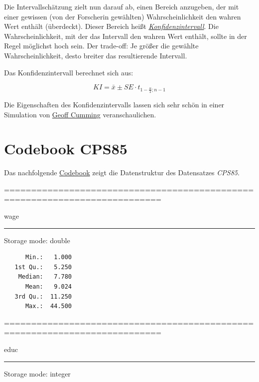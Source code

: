\documentclass[]{article}
\begin{document}
Die Intervallschätzung zielt nun darauf ab, einen Bereich anzugeben, der
mit einer gewissen (von der Forscherin gewählten) Wahrscheinlichkeit den
wahren Wert enthält (überdeckt). Dieser Bereich heißt
\href{https://de.wikipedia.org/wiki/Konfidenzintervall}{\emph{Konfidenzintervall}}.
Die Wahrscheinlichkeit, mit der das Intervall den wahren Wert enthält,
sollte in der Regel möglichst hoch sein. Der trade-off: Je größer die
gewählte Wahrscheinlichkeit, desto breiter das resultierende Intervall.

Das Konfidenzintervall berechnet sich aus:

\begin{equation} 
  KI = \bar{x} \pm SE \cdot t_{1 - \frac{\alpha}{2}; n - 1}
  \label{eq:KI}
\end{equation}

Die Eigenschaften des Konfidenzintervalls lassen sich sehr schön in
einer Simulation von
\href{https://thenewstatistics.com/itns/esci/}{Geoff Cumming}
veranschaulichen.

\hypertarget{codebook-cps85}{\section*{Codebook
CPS85}\label{codebook-cps85}}

Das nachfolgende \protect\hyperlink{codebooks-in-r}{Codebook} zeigt die
Datenstruktur des Datensatzes \emph{CPS85}.

===========================================================================

wage

\begin{center}\rule{0.5\linewidth}{\linethickness}\end{center}

Storage mode: double

\begin{verbatim}
      Min.:   1.000
   1st Qu.:   5.250
    Median:   7.780
      Mean:   9.024
   3rd Qu.:  11.250
      Max.:  44.500
\end{verbatim}

===========================================================================

educ

\begin{center}\rule{0.5\linewidth}{\linethickness}\end{center}

Storage mode: integer
\end{document}
